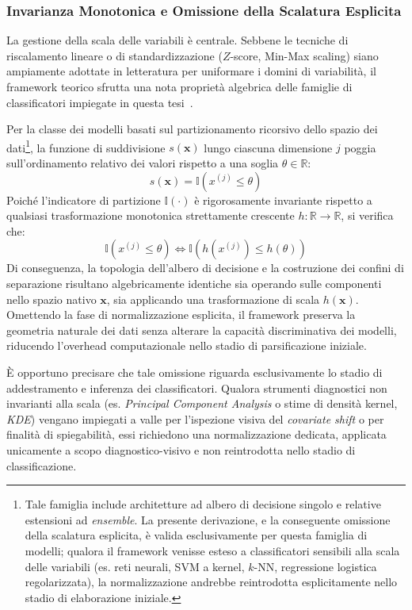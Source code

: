 \subsubsection{Invarianza Monotonica e Omissione della Scalatura Esplicita}
\label{subsubsec:invarianza_monotonica}
La gestione della scala delle variabili è centrale. Sebbene le tecniche di riscalamento lineare o di standardizzazione ($Z$-score, Min-Max scaling) siano ampiamente adottate in letteratura per uniformare i domini di variabilità, il framework teorico sfrutta una nota proprietà algebrica delle famiglie di classificatori impiegate in questa tesi~\cite{breiman1984,hastie2009}.

Per la classe dei modelli basati sul partizionamento ricorsivo dello spazio dei dati\footnote{Tale famiglia include architetture ad albero di decisione singolo e relative estensioni ad \textit{ensemble}. La presente derivazione, e la conseguente omissione della scalatura esplicita, è valida esclusivamente per questa famiglia di modelli; qualora il framework venisse esteso a classificatori sensibili alla scala delle variabili (es. reti neurali, SVM a kernel, $k$-NN, regressione logistica regolarizzata), la normalizzazione andrebbe reintrodotta esplicitamente nello stadio di elaborazione iniziale.}, la funzione di suddivisione $s(\mathbf{x})$ lungo ciascuna dimensione $j$ poggia sull'ordinamento relativo dei valori rispetto a una soglia $\theta \in \mathbb{R}$:
\begin{equation}
    s(\mathbf{x}) = \mathbb{I}\left(x^{(j)} \le \theta\right)
\end{equation}
Poiché l'indicatore di partizione $\mathbb{I}(\cdot)$ è rigorosamente invariante rispetto a qualsiasi trasformazione monotonica strettamente crescente $h: \mathbb{R} \rightarrow \mathbb{R}$, si verifica che:
\begin{equation}
    \mathbb{I}\left(x^{(j)} \le \theta\right) \iff \mathbb{I}\left(h(x^{(j)}) \le h(\theta)\right)
\end{equation}
Di conseguenza, la topologia dell'albero di decisione e la costruzione dei confini di separazione risultano algebricamente identiche sia operando sulle componenti nello spazio nativo $\mathbf{x}$, sia applicando una trasformazione di scala $h(\mathbf{x})$. Omettendo la fase di normalizzazione esplicita, il framework preserva la geometria naturale dei dati senza alterare la capacità discriminativa dei modelli, riducendo l'overhead computazionale nello stadio di parsificazione iniziale.

\`E opportuno precisare che tale omissione riguarda esclusivamente lo stadio di addestramento e inferenza dei classificatori. Qualora strumenti diagnostici non invarianti alla scala (es. \textit{Principal Component Analysis} o stime di densità kernel, \textit{KDE}) vengano impiegati a valle per l'ispezione visiva del \textit{covariate shift} o per finalità di spiegabilità, essi richiedono una normalizzazione dedicata, applicata unicamente a scopo diagnostico-visivo e non reintrodotta nello stadio di classificazione.

